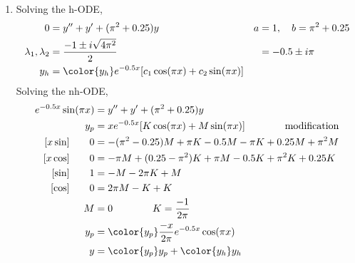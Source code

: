 \begin{enumerate}
    \item Solving the h-ODE,
          \begin{align}
              0                        & = y'' + y' + ( \pi ^{2} + 0.25 )y                            & a & = 1, \quad b = \pi ^{2} + 0.25 \\
              \lambda_{1}, \lambda_{2} & = \frac{-1 \pm i\sqrt{4\pi^{2}}}{2}                          &   & = -0.5 \pm i \pi               \\
              y_{h}                    & = \color{y_h} e^{-0.5x}[c_{1}\cos(\pi x) + c_{2}\sin(\pi x)]
          \end{align}
          Solving the nh-ODE,
          \begin{align}
              e^{-0.5x}\sin (\pi x) & =  y'' + y' + ( \pi ^{2} + 0.25 )y                                             \\
              y_{p}                 & = xe^{-0.5x}[K \cos (\pi x) + M \sin (\pi x)] \qquad\qquad \text{modification} \\
              [x\sin] \qquad 0      & = -(\pi ^{2} - 0.25)M + \pi K - 0.5M - \pi K + 0.25M + \pi ^{2}M               \\
              [x\cos] \qquad 0      & =  -\pi M  + (0.25 - \pi ^{2})K + \pi M - 0.5K + \pi ^{2}K + 0.25K             \\
              [\sin] \qquad 1       & =-M -2\pi K + M                                                                \\
              [\cos] \qquad 0       & = 2\pi M - K + K                                                               \\
              M                     & = 0 \qquad\qquad K = \frac{-1}{2\pi}                                           \\
              y_{p}                 & = \color{y_p} \frac{-x}{2\pi}e^{-0.5x}\cos(\pi x)                              \\
              y                     & = {\color{y_p} y_{p}} + {\color{y_h} y_{h}}
          \end{align}


\end{enumerate}
